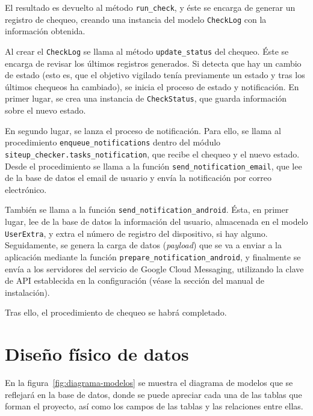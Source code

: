El resultado es devuelto al método \texttt{run\_check}, y éste se encarga de
generar un registro de chequeo, creando una instancia del modelo
\texttt{CheckLog} con la información obtenida. 

Al crear el \texttt{CheckLog} se llama al método \texttt{update\_status} del
chequeo. Éste se encarga de revisar los últimos registros generados. Si detecta
que hay un cambio de estado (esto es, que el objetivo vigilado tenía previamente
un estado y tras los últimos chequeos ha cambiado), se inicia el proceso de
estado y notificación. En primer lugar, se crea una instancia de
\texttt{CheckStatus}, que guarda información sobre el nuevo estado. 

En segundo lugar, se lanza el proceso de notificación. Para ello, se llama al
procedimiento \texttt{enqueue\_notifications} dentro del módulo
\texttt{siteup\_checker.tasks\_notification}, que recibe el chequeo y el nuevo
estado. Desde el procedimiento se llama a la función
\texttt{send\_notification\_email}, que lee de la base de datos el email de
usuario y envía la notificación por correo electrónico.

También se llama a la función \texttt{send\_notification\_android}. Ésta, en
primer lugar, lee de la base de datos la información del usuario, almacenada en
el modelo \texttt{UserExtra}, y extra el número de registro del dispositivo, si
hay alguno. Seguidamente, se genera la carga de datos (\textit{payload}) que se
va a enviar a la aplicación mediante la función
\texttt{prepare\_notification\_android}, y finalmente se envía a los servidores
del servicio de Google Cloud Messaging, utilizando la clave de API establecida
en la configuración (véase la sección
\textit{} del manual de instalación).

Tras ello, el procedimiento de chequeo se habrá completado.

\section{Diseño físico de datos}
\label{sec:diseno-fisico-datos}

En la figura~\ref{fig:diagrama-modelos} se muestra el diagrama de modelos que se
reflejará en la base de datos, donde se puede apreciar cada una de las tablas
que forman el proyecto, así como los campos de las tablas y las relaciones entre
ellas.

